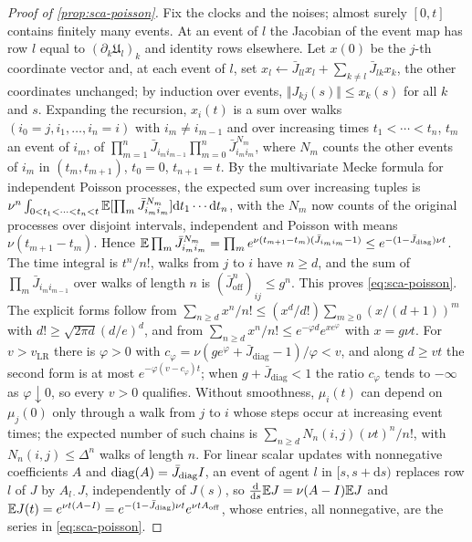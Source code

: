 \begin{proof}[Proof of \cref{prop:sca-poisson}]
Fix the clocks and the noises; almost surely $[0,t]$ contains finitely many events. At an event of $l$ the Jacobian of the event map has row $l$ equal to $(\partial_k\mathfrak U_l)_k$ and identity rows elsewhere. Let $x(0)$ be the $j$-th coordinate vector and, at each event of $l$, set $x_l\leftarrow\bar J_{ll}x_l+\sum_{k\neq l}\bar J_{lk}x_k$, the other coordinates unchanged; by induction over events, $\Vert J_{kj}(s)\Vert\le x_k(s)$ for all $k$ and $s$. Expanding the recursion, $x_i(t)$ is a sum over walks $(i_0=j,i_1,\dots,i_n=i)$ with $i_m\neq i_{m-1}$ and over increasing times $t_1<\cdots<t_n$, $t_m$ an event of $i_m$, of $\prod_{m=1}^n\bar J_{i_mi_{m-1}}\prod_{m=0}^n\bar J_{i_mi_m}^{N_m}$, where $N_m$ counts the other events of $i_m$ in $(t_m,t_{m+1})$, $t_0=0$, $t_{n+1}=t$. By the multivariate Mecke formula for independent Poisson processes, the expected sum over increasing tuples is $\nu^n\int_{0<t_1<\cdots<t_n<t}\mathbb{E}[\prod_m\bar J_{i_mi_m}^{N_m}]\mathrm{d}t_1\cdots\mathrm{d}t_n$, with the $N_m$ now counts of the original processes over disjoint intervals, independent and Poisson with means $\nu(t_{m+1}-t_m)$. Hence $\mathbb{E}\prod_m\bar J_{i_mi_m}^{N_m}=\prod_me^{\nu(t_{m+1}-t_m)(\bar J_{i_mi_m}-1)}\le e^{-(1-\bar J_{\mathrm{diag}})\nu t}$. The time integral is $t^n/n!$, walks from $j$ to $i$ have $n\ge d$, and the sum of $\prod_m\bar J_{i_mi_{m-1}}$ over walks of length $n$ is $(\bar J_{\mathrm{off}}^n)_{ij}\le g^n$. This proves \eqref{eq:sca-poisson}. The explicit forms follow from $\sum_{n\ge d}x^n/n!\le(x^d/d!)\sum_{m\ge0}(x/(d+1))^m$ with $d!\ge\sqrt{2\pi d}(d/e)^d$, and from $\sum_{n\ge d}x^n/n!\le e^{-\varphi d}e^{xe^\varphi}$ with $x=g\nu t$. For $v>v_{\mathrm{LR}}$ there is $\varphi>0$ with $c_\varphi=\nu(ge^\varphi+\bar J_{\mathrm{diag}}-1)/\varphi<v$, and along $d\ge vt$ the second form is at most $e^{-\varphi(v-c_\varphi)t}$; when $g+\bar J_{\mathrm{diag}}<1$ the ratio $c_\varphi$ tends to $-\infty$ as $\varphi\downarrow0$, so every $v>0$ qualifies. Without smoothness, $\mu_i(t)$ can depend on $\mu_j(0)$ only through a walk from $j$ to $i$ whose steps occur at increasing event times; the expected number of such chains is $\sum_{n\ge d}N_n(i,j)(\nu t)^n/n!$, with $N_n(i,j)\le\Delta^n$ walks of length $n$. For linear scalar updates with nonnegative coefficients $A$ and $\operatorname{diag}(A)=\bar J_{\mathrm{diag}}I$, an event of agent $l$ in $[s,s+\mathrm{d}s)$ replaces row $l$ of $J$ by $A_{l\cdot}J$, independently of $J(s)$, so $\frac{\mathrm d}{\mathrm ds}\mathbb{E} J=\nu(A-I)\mathbb{E} J$ and $\mathbb{E} J(t)=e^{\nu t(A-I)}=e^{-(1-\bar J_{\mathrm{diag}})\nu t}e^{\nu tA_{\mathrm{off}}}$, whose entries, all nonnegative, are the series in \eqref{eq:sca-poisson}.
\end{proof}

